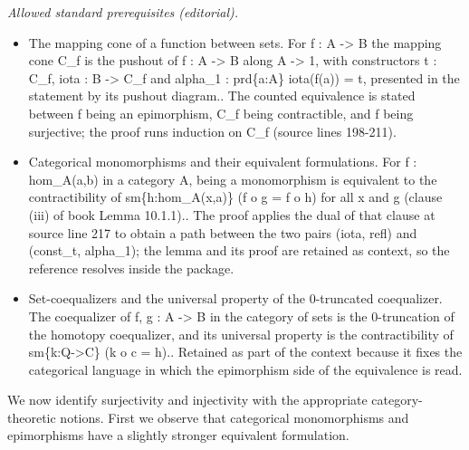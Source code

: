 \documentclass[10pt,a4paper]{article}
\theoremstyle{definition}
\theoremstyle{remark}
\numberwithin{equation}{section}
\begin{document}
\noindent\textit{Allowed standard prerequisites (editorial).}\begin{itemize}
\item The mapping cone of a function between sets. For f : A -> B the mapping cone C\_f is the pushout of f : A -> B along A -> 1, with constructors t : C\_f, iota : B -> C\_f and alpha\_1 : prd\{a:A\} iota(f(a)) = t, presented in the statement by its pushout diagram.. The counted equivalence is stated between f being an epimorphism, C\_f being contractible, and f being surjective; the proof runs induction on C\_f (source lines 198-211).
\item Categorical monomorphisms and their equivalent formulations. For f : hom\_A(a,b) in a category A, being a monomorphism is equivalent to the contractibility of sm\{h:hom\_A(x,a)\} (f o g = f o h) for all x and g (clause (iii) of book Lemma 10.1.1).. The proof applies the dual of that clause at source line 217 to obtain a path between the two pairs (iota, refl) and (const\_t, alpha\_1); the lemma and its proof are retained as context, so the reference resolves inside the package.
\item Set-coequalizers and the universal property of the 0-truncated coequalizer. The coequalizer of f, g : A -> B in the category of sets is the 0-truncation of the homotopy coequalizer, and its universal property is the contractibility of sm\{k:Q->C\} (k o c = h).. Retained as part of the context because it fixes the categorical language in which the epimorphism side of the equivalence is read.
\end{itemize}\medskip
We now identify surjectivity and injectivity with the appropriate cat\-e\-go\-ry-theoretic notions.
First we observe that categorical monomorphisms and epimorphisms have a slightly stronger equivalent formulation.
\end{document}
